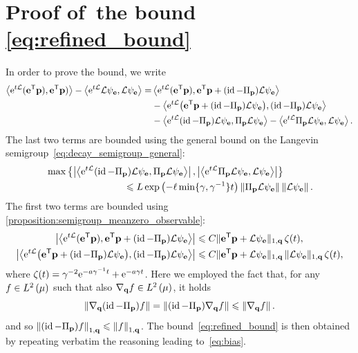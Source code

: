 \documentclass[11pt,a4paper]{article}
\begin{document}
\section{Proof of~\texorpdfstring{the bound \eqref{eq:refined_bound}}{the technical bound on the bias}}%
\label{sec:proof_technical_result}
In order to prove the bound,
we write
\begin{align*}
    \ip{\e^{t \mathcal L}(\vect e^\t \vect p)}{\vect e^\t \vect p)} - \ip{\e^{t \mathcal L} \mathcal L \psi_{\vect e}}{\mathcal L \psi_{\vect e}}
    = &\ip{\e^{t \mathcal L} (\vect e^\t \vect p)}{\vect e^\t \vect p + (\id - \Pi_{\vect p}) \mathcal L \psi_{\vect e}} \\
    & - \ip{\e^{t \mathcal L} \bigl(\vect e^\t \vect p + (\id - \Pi_{\vect p}) \mathcal L \psi_{\vect e}\bigr)}{(\id - \Pi_{\vect p}) \mathcal L \psi_{\vect e}} \\
    & - \ip{\e^{t \mathcal L} (\id - \Pi_{\vect p}) \mathcal L \psi_{\vect e}}{\Pi_{\vect p} \mathcal L \psi_{\vect e}}
    - \ip{\e^{t \mathcal L} \Pi_{\vect p} \mathcal L \psi_{\vect e}}{\mathcal L \psi_{\vect e}}.
\end{align*}
The last two terms are bounded using the general bound on the Langevin semigroup~\eqref{eq:decay_semigroup_general}:
\begin{align*}
    &\max \left\{
    \abs{\ip{\e^{t \mathcal L} (\id - \Pi_{\vect p}) \mathcal L \psi_{\vect e}}{\Pi_{\vect p} \mathcal L \psi_{\vect e}}},
    \abs{\ip{\e^{t \mathcal L} \Pi_{\vect p} \mathcal L \psi_{\vect e}}{\mathcal L \psi_{\vect e}}}
    \right\} \\
    &\qquad \qquad \qquad \qquad \leq L \exp \left( - \ell \min\{\gamma, \gamma^{-1}\} t\right) \norm{\Pi_{\vect p} \mathcal L \psi_{\vect e}} \norm{\mathcal L \psi_{\vect e}}.
\end{align*}
The first two terms are bounded using \cref{proposition:semigroup_meanzero_observable}:
\begin{align*}
    \abs{\ip{\e^{t \mathcal L} (\vect e^\t \vect p)}{\vect e^\t \vect p + (\id - \Pi_{\vect p}) \mathcal L \psi_{\vect e}}}
    &\leq C \norm*{\vect e^\t \vect p + \mathcal L \psi_{\vect e}}[1,\vect q] \, \zeta(t), \\
    \abs{\ip{\e^{t \mathcal L} \bigl(\vect e^\t \vect p + (\id - \Pi_{\vect p}) \mathcal L \psi_{\vect e}\bigr)}{(\id - \Pi_{\vect p}) \mathcal L \psi_{\vect e}}}
    &\leq C \norm*{\vect e^\t \vect p + \mathcal L \psi_{\vect e}}[1,\vect q] \, \norm*{\mathcal L \psi_{\vect e}}[1,\vect q] \, \zeta(t),
\end{align*}
where $\zeta(t) = \gamma^{-2} \mathrm{e}^{- a \gamma^{-1} t } + \mathrm{e}^{- a \gamma t}$.
Here we employed the fact that, for any $f \in \lp{2}{\mu}$ such that also $\grad_{\vect q} f \in \lp{2}{\mu}$,
it holds
\[
    \norm{\grad_{\vect q} (\id - \Pi_{\vect p}) f}
    = \norm{(\id - \Pi_{\vect p}) \grad_{\vect q} f}
    \leq \norm{\grad_{\vect q} f}.
\]
and so $\norm{(\id - \Pi_{\vect p}) f}[1,\vect q] \leq \norm{f}[1,\vect q]$.
The bound~\eqref{eq:refined_bound} is then obtained by repeating verbatim the reasoning leading to~\eqref{eq:bias}.
\end{document}
